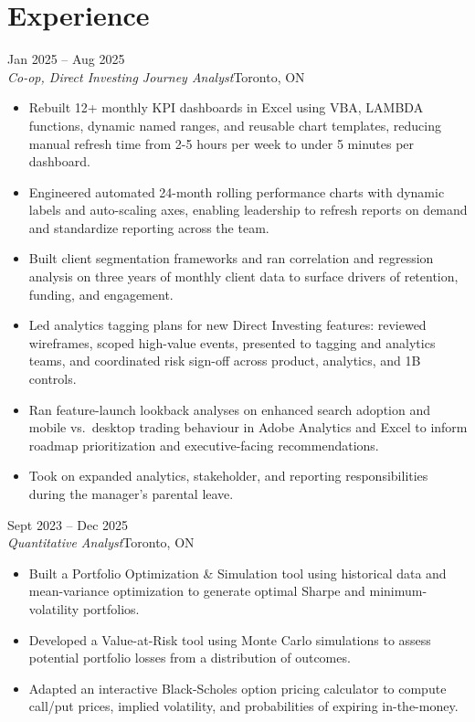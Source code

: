 \documentclass[10pt,letterpaper]{article}
\newcommand{\role}[4]{%
  \needspace{4\baselineskip}%
  \noindent{\large\bfseries #1}\hfill{\color{soft}\small #2}\\
  {\color{soft}\itshape #3}\hfill{\color{soft}\small #4}\\[1pt]
}
\begin{document}
\section*{Experience}
\role{TD Bank}{Jan 2025 -- Aug 2025}{Co-op, Direct Investing Journey Analyst}{Toronto, ON}
\begin{itemize}
  \item Rebuilt 12+ monthly KPI dashboards in Excel using VBA, LAMBDA functions, dynamic named ranges, and reusable chart templates, reducing manual refresh time from 2-5 hours per week to under 5 minutes per dashboard.
  \item Engineered automated 24-month rolling performance charts with dynamic labels and auto-scaling axes, enabling leadership to refresh reports on demand and standardize reporting across the team.
  \item Built client segmentation frameworks and ran correlation and regression analysis on three years of monthly client data to surface drivers of retention, funding, and engagement.
  \item Led analytics tagging plans for new Direct Investing features: reviewed wireframes, scoped high-value events, presented to tagging and analytics teams, and coordinated risk sign-off across product, analytics, and 1B controls.
  \item Ran feature-launch lookback analyses on enhanced search adoption and mobile vs.\ desktop trading behaviour in Adobe Analytics and Excel to inform roadmap prioritization and executive-facing recommendations.
  \item Took on expanded analytics, stakeholder, and reporting responsibilities during the manager's parental leave.
\end{itemize}

\role{Ted Rogers Sales \& Trading (TRST)}{Sept 2023 -- Dec 2025}{Quantitative Analyst}{Toronto, ON}
\begin{itemize}
  \item Built a Portfolio Optimization \& Simulation tool using historical data and mean-variance optimization to generate optimal Sharpe and minimum-volatility portfolios.
  \item Developed a Value-at-Risk tool using Monte Carlo simulations to assess potential portfolio losses from a distribution of outcomes.
  \item Adapted an interactive Black-Scholes option pricing calculator to compute call/put prices, implied volatility, and probabilities of expiring in-the-money.
\end{itemize}
\end{document}

